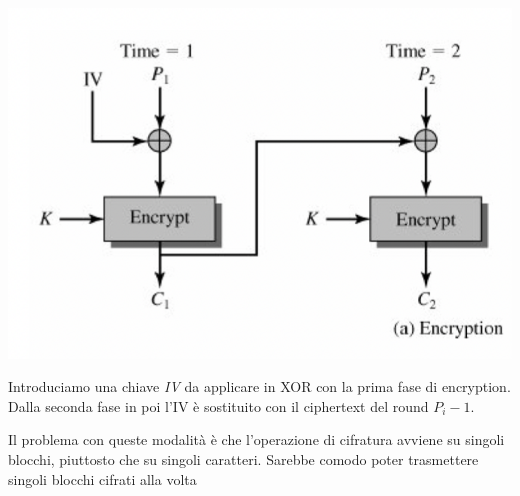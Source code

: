 \documentclass[11pt, oneside]{article}   	%
\begin{document}
\begin{itemize}
\begin{center}
\includegraphics[scale= 0.7]{cbc}\\
\end{center}
Introduciamo una chiave \emph{IV} da applicare in XOR con la prima fase di encryption. Dalla seconda fase in poi l'IV è sostituito con il ciphertext del round $P_i-1$.
\end{itemize}
Il problema con queste modalità è che l'operazione di cifratura avviene su singoli blocchi, piuttosto che su singoli caratteri. Sarebbe comodo poter trasmettere singoli blocchi cifrati alla volta
\end{document}
